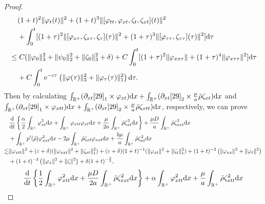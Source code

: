 \documentclass[11pt]{article}
\theoremstyle{plain}
\numberwithin{equation}{section}
\begin{document}
\begin{proof}
\begin{align}\label{59}
			&\;\;\;\;(1+t)^2\|\varphi_t(t)\|^2+(1+t)^3\|[\varphi_{tt},\varphi_{xt},\zeta_{t},\zeta_{xt}](t)\|^2\notag\\
			&\;\;\;\;+\int_{0}^{t}[(1+\tau)^2\|[\varphi_{x\tau},\zeta_{x\tau},\zeta_{\tau}](\tau)\|^2+(1+\tau)^3\|[\varphi_{\tau\tau},\zeta_{\tau\tau}](\tau)\|^2]{\rm d}\tau\notag\\
			&\leq C(\|\varphi_0\|_3^2+\|\psi_0\|_2^2+\|\zeta_0\|_3^2+\delta)+C\int_{0}^{t}[(1+\tau)^2\|\varphi_{xx\tau}\|+(1+\tau)^4\|\varphi_{x\tau\tau}\|^2]{\rm d}\tau\notag\\ 
			&\;\;\;\;+C\int_{0}^{t}{\rm e}^{-c\tau}\left(\|\varphi(\tau)\|_3^2+\|\varphi_{\tau}(\tau)\|_1^2\right){\rm d}\tau.
		\end{align}
Then by calculating $\int_{\mathbb{R}^+}(\partial_{xt}\eqref{29}_1\times \varphi_{xt}){\rm d}x+\int_{\mathbb{R}^+}(\partial_{xt}\eqref{29}_2\times\frac{\mu}{a}\bar\rho\zeta_{xt}){\rm d}x$ and $\int_{\mathbb{R}^+}(\partial_{xt}\eqref{29}_1\times \varphi_{xtt}){\rm d}x+\int_{\mathbb{R}^+}(\partial_{xt}\eqref{29}_2\times\frac{\mu}{a}\bar\rho\zeta_{xtt}){\rm d}x$, respectively, we can prove
\begin{align}\label{13.70}
			&\frac{{\rm d}}{{\rm d}t}\left\{\frac{\alpha}{2}\int_{\mathbb{R}^+}\varphi_{xt}^2{\rm d}x+\int_{\mathbb{R}^+}^{}\varphi_{xtt}\varphi_{xt}{\rm d}x+\frac{\mu}{2a}\int_{\mathbb{R}^+}^{}\bar\rho\zeta_{xt}^2{\rm d}x\right\}+\frac{\mu D}{a}\int_{\mathbb{R}^+}^{}\bar\rho\zeta_{xxt}^2{\rm d}x	\notag\\
			&+\int_{\mathbb{R}^+}^{}p^{\prime}(\bar\rho)\varphi_{xxt}^2{\rm d}x-2\mu\int_{\mathbb{R}^+}^{}\bar\rho\zeta_{xt}\varphi_{xxt}{\rm d}x+\frac{b\mu}{a}\int_{\mathbb{R}^+}^{}\bar\rho\zeta_{xt}^2{\rm d}x\notag\\
			\lesssim& \|\varphi_{xtt}\|^2 +(\varepsilon+\delta)(\|\varphi_{xxt}\|^2+\|\zeta_{xt}\|_1^2)+(\varepsilon+\delta)(1+t)^{-1}(\|\varphi_{xt}\|^2+\|\zeta_{t}\|_1^2)+(1+t)^{-2}\left(\|\varphi_{xx}\|^2+\|\varphi_t\|^2\right)\notag\\ 
			&+(1+t)^{-3}\left(\|\varphi_x\|^2+\|\zeta\|^2\right)+\delta (1+t)^{-\frac{9}{2}}, 
		\end{align}
\begin{align}\label{13.71}
			&\frac{{\rm d}}{{\rm d}t}\left\{\frac{1}{2}\int_{\mathbb{R}^+}\varphi_{xtt}^2{\rm d}x	+\frac{\mu D}{2a}\int_{\mathbb{R}^+}^{}\bar\rho\zeta_{xxt}^2{\rm d}x\right\}+\alpha\int_{\mathbb{R}^+}\varphi_{xtt}^2{\rm d}x+\frac{\mu}{a}\int_{\mathbb{R}^+}^{}\bar\rho\zeta_{xtt}^2{\rm d}x\notag\\

\end{align}
\end{proof}
\end{document}
